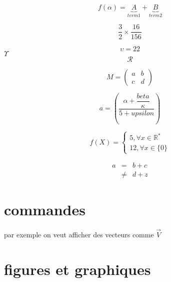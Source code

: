 \documentclass[a4paper, 10pt]{article}
\begin{document}
\begin{multicols}{2}
\begin{itemize}
$$
f(\alpha)=\underbrace{A}_{term1} +\underbrace{B}_{term2}
$$

$$
\frac{3}{2} \times \frac{16}{156} 
$$

\begin{equation}
\upsilon=22
\label{eq:fractions}
\end{equation}
$\Upsilon$
$$
\mathcal R %
$$

\begin{equation}
M=
\begin{pmatrix}

a & b \\
c & d
\end{pmatrix}
\end{equation}

$$
a=
\left(
\dfrac{\alpha + \dfrac{beta}{\kappa}}{5+upsilon}
\right)
$$

$$
f(X)=
\left\lbrace
\begin{split}
5, \forall x \in \mathbb R^*\\
12, \forall x \in \lbrace 0 \rbrace
\end{split}
\right. %
$$

\begin{eqnarray}
a & =    & b + c\\
  & \neq & d + z
\end{eqnarray}



\end{itemize}




\section{commandes}
\newcommand{\myvec}[1]{\vec #1} %
par exemple on veut afficher des vecteurs comme $\myvec V$


\section{figures et graphiques}


\end{multicols}
\end{document}
